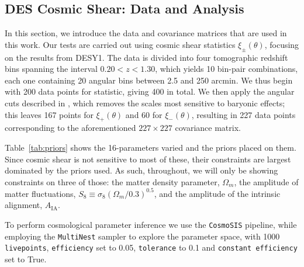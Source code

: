 \documentclass[twocolumn,nofootinbib]{\docclass}
\begin{document}
\subsection{DES Cosmic Shear: Data and Analysis}
\label{subsec:data_and_analysis}

In this section, we introduce the data and covariance matrices that are used in this work. Our tests are carried out using cosmic shear statistics $\xi_\pm(\theta)$, focusing on the results from DESY1. The data is divided into four tomographic redshift bins spanning the interval $0.20 < z < 1.30$, which yields 10 bin-pair combinations, each one containing 20 angular bins between 2.5 and 250 arcmin. We thus begin with 200 data points for statistic, giving 400 in total. We then apply the angular cuts described in \cite{Abbott:2018cms}, which removes the scales most sensitive to baryonic effects; this leaves 167 points for $\xi_+(\theta)$ and 60 for $\xi_-(\theta)$, resulting in 227 data points corresponding to the aforementioned $227 \times 227$ covariance matrix. 

Table~\ref{tab:priors} shows the 16-parameters varied and the priors placed on them. Since cosmic shear is not sensitive to most of these, their constraints are largest dominated by the priors used. As such, throughout, we will only be showing constraints on three of those: the matter density parameter, $\Omega_m$, the amplitude of matter fluctuations, $S_8 \equiv \sigma_8 (\Omega_m/0.3)^{0.5}$, and the amplitude of the intrinsic alignment, $A_{\text{IA}}$.

To perform cosmological parameter inference we use the \texttt{CosmoSIS} \cite{Zuntz:2015med, Lewis:2000taj, Kirk:2012mnras, Kilbinger:2009aa, Howlett:2012jcap, Bridle:2007njp, Takahashi:2012taj, Smith:2003mnras} pipeline, while employing the \texttt{MultiNest} \cite{Feroz:2009fhb} sampler to explore the parameter space, with 1000 \texttt{livepoints}, \texttt{efficiency} set to 0.05, \texttt{tolerance} to 0.1 and \texttt{constant efficiency} set to True.
\end{document}
